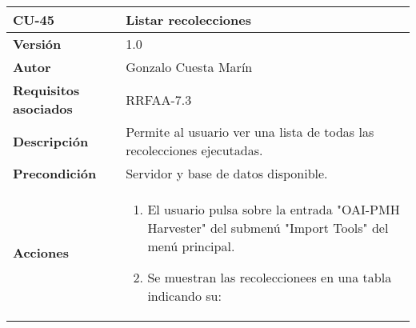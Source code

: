 \begin{longtable}[]{@{}ll@{}}
\toprule
\begin{minipage}[b]{0.19\columnwidth}\raggedright
\textbf{CU-45}\strut
\end{minipage} & \begin{minipage}[b]{0.76\columnwidth}\raggedright
\textbf{Listar recolecciones}\strut
\end{minipage}\tabularnewline
\midrule
\endhead
\begin{minipage}[t]{0.19\columnwidth}\raggedright
\textbf{Versión}\strut
\end{minipage} & \begin{minipage}[t]{0.76\columnwidth}\raggedright
1.0\strut
\end{minipage}\tabularnewline
\begin{minipage}[t]{0.19\columnwidth}\raggedright
\textbf{Autor}\strut
\end{minipage} & \begin{minipage}[t]{0.76\columnwidth}\raggedright
Gonzalo Cuesta Marín\strut
\end{minipage}\tabularnewline
\begin{minipage}[t]{0.19\columnwidth}\raggedright
\textbf{Requisitos asociados}\strut
\end{minipage} & \begin{minipage}[t]{0.76\columnwidth}\raggedright
RRFAA-7.3\strut
\end{minipage}\tabularnewline
\begin{minipage}[t]{0.19\columnwidth}\raggedright
\textbf{Descripción}\strut
\end{minipage} & \begin{minipage}[t]{0.76\columnwidth}\raggedright
Permite al usuario ver una lista de todas las recolecciones
ejecutadas.\strut
\end{minipage}\tabularnewline
\begin{minipage}[t]{0.19\columnwidth}\raggedright
\textbf{Precondición}\strut
\end{minipage} & \begin{minipage}[t]{0.76\columnwidth}\raggedright
Servidor y base de datos disponible.\strut
\end{minipage}\tabularnewline
\begin{minipage}[t]{0.19\columnwidth}\raggedright
\textbf{Acciones}\strut
\end{minipage} & \begin{minipage}[t]{0.76\columnwidth}\raggedright
\begin{enumerate}
\def\labelenumi{\arabic{enumi}.}
\tightlist
\item
  El usuario pulsa sobre la entrada "OAI-PMH Harvester" del submenú
  "Import Tools" del menú principal.
\item
  Se muestran las recoleccionees en una tabla indicando su:


\end{enumerate}
\end{minipage}
\end{longtable}
